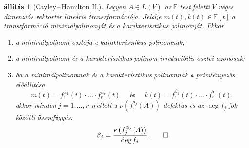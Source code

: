 \documentclass[a4paper, showtrims]{memoir}
\theoremstyle{plain}
\newtheorem{proposition}{állítás}[chapter]
\theoremstyle{remark}
\theoremstyle{definition}
\begin{document}
\begin{proposition}[Cayley\,--\,Hamilton II.]
    Legyen $A\in L\left( V \right)$ az $\mathbb{F}$ test feletti $V$ véges dimenziós vektortér
    lineáris transzformációja.
    Jelölje $m\left( t \right), k\left( t \right)\in\mathbb{F}\left[ t \right]$
    a transzformáció minimálpolinomját és a karakterisztikus polinomját.
    Ekkor
    \begin{enumerate}
        \item a minimálpolinom osztója a karakterisztikus polinomnak;
        \item a minimálpolinom és a karakterisztikus polinom irreducibilis osztói azonosak;
        \item ha a minimálpolinomnak és a karakterisztikus polinomnak a primtényezős előállítása
            \[
                m\left( t \right)
                =
                f_1^{\alpha_1}\left( t \right)
                \cdot\ldots\cdot
                f_r^{\alpha_r}\left( t \right)
                \quad\text{ és }\quad
                k\left( t \right)
                =
                f_1^{\beta_1}\left( t \right)
                \cdot\ldots\cdot
                f_r^{\beta_1}\left( t \right),
            \]
            akkor minden $j=1,\ldots,r$ mellett a $\nu\left( f_j^{\alpha_j} \left( A \right)\right)$ defektus
            és az $\deg f_j$ fok közötti összefüggés:
            \[
                \beta_j
                =
                \frac{\nu\left( f_j^{\alpha_j}\left( A \right) \right)}{\deg f_j}.
                \qedhere
            \]
    \end{enumerate}
\end{proposition}
\end{document}
